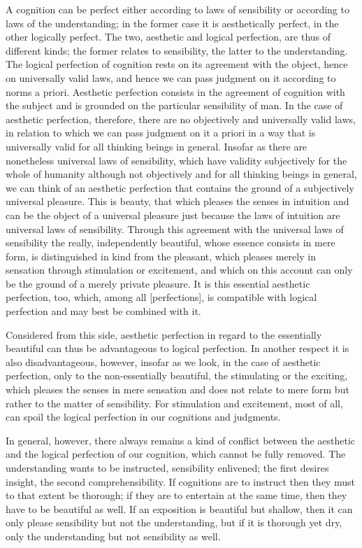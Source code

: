 A cognition can be perfect either
according to laws of sensibility or
according to laws of the understanding;
in the former case it is aesthetically perfect,
in the other logically perfect.
The two, aesthetic and logical perfection, are thus of different kinds;
the former relates to sensibility, the latter to the understanding.
The logical perfection of cognition rests on its agreement with the object,
hence on universally valid laws, and hence we
can pass judgment on it according to norms a priori.
Aesthetic perfection
consists in the agreement of cognition with the subject and is grounded on
the particular sensibility of man.
In the case of aesthetic perfection, therefore,
there are no objectively and universally valid laws, in relation to
which we can pass judgment on it a priori in a way that is universally valid
for all thinking beings in general.
Insofar as there are nonetheless universal laws of sensibility,
which have validity subjectively for the whole of humanity
although not objectively and for all thinking beings in general,
we can think of an aesthetic perfection that contains the ground of a
subjectively universal pleasure.
This is beauty, that which pleases the senses in intuition and
can be the object of a universal pleasure just because
the laws of intuition are universal laws of sensibility.
Through this agreement with the universal laws of sensibility
the really, independently beautiful,
whose essence consists in mere form,
is distinguished in kind from the pleasant,
which pleases merely in sensation
through stimulation or excitement,
and which on this account can only be
the ground of a merely private pleasure.
It is this essential aesthetic perfection, too,
which, among all [perfections], is compatible with
logical perfection and may best be combined with it.

Considered from this side, aesthetic perfection in regard to the essentially
beautiful can thus be advantageous to logical perfection. In another
respect it is also disadvantageous, however, insofar as we look, in the case
of aesthetic perfection, only to the non-essentially beautiful, the stimulating
or the exciting, which pleases the senses in mere sensation and does not
relate to mere form but rather to the matter of sensibility. For stimulation
and excitement, most of all, can spoil the logical perfection in our
cognitions and judgments.

In general, however, there always remains a kind of conflict between the
aesthetic and the logical perfection of our cognition, which cannot be fully
removed. The understanding wants to be instructed, sensibility enlivened;
the first desires insight, the second comprehensibility. If cognitions are to
instruct then they must to that extent be thorough; if they are to entertain
at the same time, then they have to be beautiful as well. If an exposition is
beautiful but shallow, then it can only please sensibility but not the understanding,
but if it is thorough yet dry, only the understanding but not
sensibility as well.

